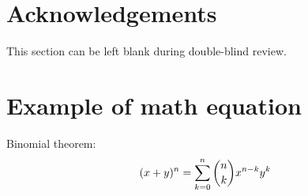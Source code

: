 \documentclass[10pt]{cai}
\begin{document}
\section*{Acknowledgements}
This section can be left blank during double-blind review. 


\appendix

\section{Example of math equation }
Binomial theorem: \cite{abramowitz1948handbook}
\begin{equation}
(x+y)^n=\sum_{\substack{k=0}}^{n}\dbinom{n}{k}x^{n-k}y^k
\end{equation}


\printbibliography[heading=subbibintoc]
\end{document}
